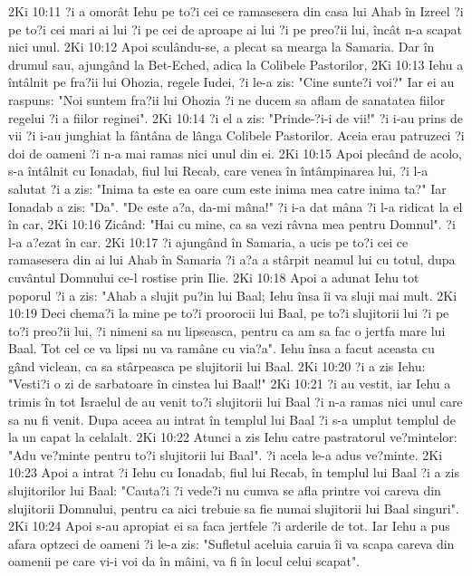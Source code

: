 2Ki 10:11  ?i a omorât Iehu pe to?i cei ce ramasesera din casa lui Ahab în Izreel ?i pe to?i cei mari ai lui ?i pe cei de aproape ai lui ?i pe preo?ii lui, încât n-a scapat nici unul.
2Ki 10:12  Apoi sculându-se, a plecat sa mearga la Samaria. Dar în drumul sau, ajungând la Bet-Eched, adica la Colibele Pastorilor,
2Ki 10:13  Iehu a întâlnit pe fra?ii lui Ohozia, regele Iudei, ?i le-a zis: "Cine sunte?i voi?" Iar ei au raspuns: "Noi suntem fra?ii lui Ohozia ?i ne ducem sa aflam de sanatatea fiilor regelui ?i a fiilor reginei".
2Ki 10:14  ?i el a zis: "Prinde-?i-i de vii!" ?i i-au prins de vii ?i i-au junghiat la fântâna de lânga Colibele Pastorilor. Aceia erau patruzeci ?i doi de oameni ?i n-a mai ramas nici unul din ei.
2Ki 10:15  Apoi plecând de acolo, s-a întâlnit cu Ionadab, fiul lui Recab, care venea în întâmpinarea lui, ?i l-a salutat ?i a zis: "Inima ta este ea oare cum este inima mea catre inima ta?" Iar Ionadab a zis: "Da". "De este a?a, da-mi mâna!" ?i i-a dat mâna ?i l-a ridicat la el în car,
2Ki 10:16  Zicând: "Hai cu mine, ca sa vezi râvna mea pentru Domnul". ?i l-a a?ezat în car.
2Ki 10:17  ?i ajungând în Samaria, a ucis pe to?i cei ce ramasesera din ai lui Ahab în Samaria ?i a?a a stârpit neamul lui cu totul, dupa cuvântul Domnului ce-l rostise prin Ilie.
2Ki 10:18  Apoi a adunat Iehu tot poporul ?i a zis: "Ahab a slujit pu?in lui Baal; Iehu însa îi va sluji mai mult.
2Ki 10:19  Deci chema?i la mine pe to?i proorocii lui Baal, pe to?i slujitorii lui ?i pe to?i preo?ii lui, ?i nimeni sa nu lipseasca, pentru ca am sa fac o jertfa mare lui Baal. Tot cel ce va lipsi nu va ramâne cu via?a". Iehu însa a facut aceasta cu gând viclean, ca sa stârpeasca pe slujitorii lui Baal.
2Ki 10:20  ?i a zis Iehu: "Vesti?i o zi de sarbatoare în cinstea lui Baal!"
2Ki 10:21  ?i au vestit, iar Iehu a trimis în tot Israelul de au venit to?i slujitorii lui Baal ?i n-a ramas nici unul care sa nu fi venit. Dupa aceea au intrat în templul lui Baal ?i s-a umplut templul de la un capat la celalalt.
2Ki 10:22  Atunci a zis Iehu catre pastratorul ve?mintelor: "Adu ve?minte pentru to?i slujitorii lui Baal". ?i acela le-a adus ve?minte.
2Ki 10:23  Apoi a intrat ?i Iehu cu Ionadab, fiul lui Recab, în templul lui Baal ?i a zis slujitorilor lui Baal: "Cauta?i ?i vede?i nu cumva se afla printre voi careva din slujitorii Domnului, pentru ca aici trebuie sa fie numai slujitorii lui Baal singuri".
2Ki 10:24  Apoi s-au apropiat ei sa faca jertfele ?i arderile de tot. Iar Iehu a pus afara optzeci de oameni ?i le-a zis: "Sufletul aceluia caruia îi va scapa careva din oamenii pe care vi-i voi da în mâini, va fi în locul celui scapat".
